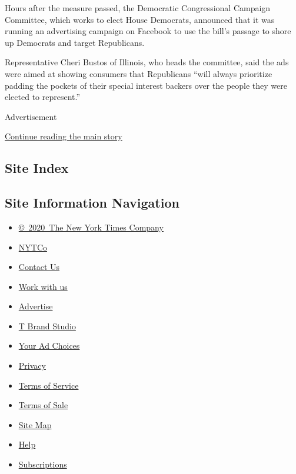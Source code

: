 Hours after the measure passed, the Democratic Congressional Campaign
Committee, which works to elect House Democrats, announced that it was
running an advertising campaign on Facebook to use the bill's passage to
shore up Democrats and target Republicans.

Representative Cheri Bustos of Illinois, who heads the committee, said
the ads were aimed at showing consumers that Republicans ``will always
prioritize padding the pockets of their special interest backers over
the people they were elected to represent.''

Advertisement

\protect\hyperlink{after-bottom}{Continue reading the main story}

\hypertarget{site-index}{%
\subsection{Site Index}\label{site-index}}

\hypertarget{site-information-navigation}{%
\subsection{Site Information
Navigation}\label{site-information-navigation}}

\begin{itemize}
\tightlist
\item
  \href{https://help.nytimes3xbfgragh.onion/hc/en-us/articles/115014792127-Copyright-notice}{©~2020~The
  New York Times Company}
\end{itemize}

\begin{itemize}
\tightlist
\item
  \href{https://www.nytco.com/}{NYTCo}
\item
  \href{https://help.nytimes3xbfgragh.onion/hc/en-us/articles/115015385887-Contact-Us}{Contact
  Us}
\item
  \href{https://www.nytco.com/careers/}{Work with us}
\item
  \href{https://nytmediakit.com/}{Advertise}
\item
  \href{http://www.tbrandstudio.com/}{T Brand Studio}
\item
  \href{https://www.nytimes3xbfgragh.onion/privacy/cookie-policy\#how-do-i-manage-trackers}{Your
  Ad Choices}
\item
  \href{https://www.nytimes3xbfgragh.onion/privacy}{Privacy}
\item
  \href{https://help.nytimes3xbfgragh.onion/hc/en-us/articles/115014893428-Terms-of-service}{Terms
  of Service}
\item
  \href{https://help.nytimes3xbfgragh.onion/hc/en-us/articles/115014893968-Terms-of-sale}{Terms
  of Sale}
\item
  \href{https://spiderbites.nytimes3xbfgragh.onion}{Site Map}
\item
  \href{https://help.nytimes3xbfgragh.onion/hc/en-us}{Help}
\item
  \href{https://www.nytimes3xbfgragh.onion/subscription?campaignId=37WXW}{Subscriptions}
\end{itemize}
